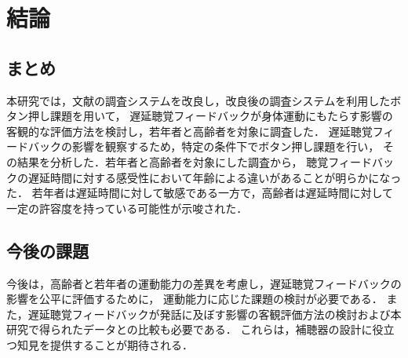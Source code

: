 \section{結論}
\subsection{まとめ}
本研究では，文献\cite{cf:shigematu}の調査システムを改良し，改良後の調査システムを利用したボタン押し課題を用いて，
遅延聴覚フィードバックが身体運動にもたらす影響の客観的な評価方法を検討し，若年者と高齢者を対象に調査した．
遅延聴覚フィードバックの影響を観察するため，特定の条件下でボタン押し課題を行い，
その結果を分析した．若年者と高齢者を対象にした調査から，
聴覚フィードバックの遅延時間に対する感受性において年齢による違いがあることが明らかになった．
若年者は遅延時間に対して敏感である一方で，高齢者は遅延時間に対して一定の許容度を持っている可能性が示唆された．
\subsection{今後の課題}
今後は，高齢者と若年者の運動能力の差異を考慮し，遅延聴覚フィードバックの影響を公平に評価するために，
運動能力に応じた課題の検討が必要である．
また，遅延聴覚フィードバックが発話に及ぼす影響の客観評価方法の検討および本研究で得られたデータとの比較も必要である．
これらは，補聴器の設計に役立つ知見を提供することが期待される．